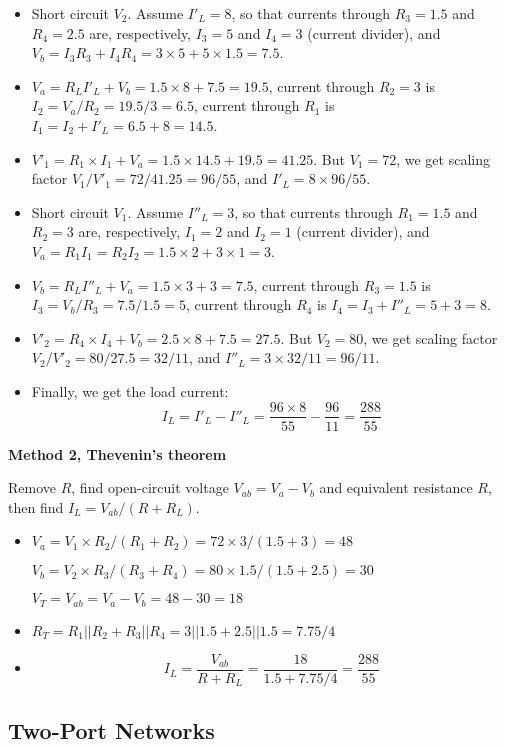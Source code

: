\begin{itemize}

\item Short circuit $V_2$. Assume $I'_L=8$, so that currents through
	$R_3=1.5$ and $R_4=2.5$ are, respectively, $I_3=5$ and $I_4=3$
	(current divider), and $V_b=I_3R_3+I_4R_4=3\times 5+5\times 1.5=7.5$.
\item $V_a=R_L I'_L+V_b=1.5\times 8+7.5=19.5$, current through $R_2=3$
	is $I_2=V_a/R_2=19.5/3=6.5$, current through $R_1$ is 
	$I_1=I_2+I'_L=6.5+8=14.5$.
\item $V'_1=R_1\times I_1+V_a=1.5\times 14.5+19.5=41.25$. But $V_1=72$,
	we get scaling factor $V_1/V'_1=72/41.25=96/55$, and 
	$I'_L=8 \times 96/55$.

\item Short circuit $V_1$. Assume $I''_L=3$, so that currents through
	$R_1=1.5$ and $R_2=3$ are, respectively, $I_1=2$ and $I_2=1$
	(current divider), and $V_a=R_1I_1=R_2I_2=1.5\times 2+3\times 1=3$.
\item $V_b=R_L I''_L+V_a=1.5\times 3+3=7.5$, current through $R_3=1.5$
	is $I_3=V_b/R_3=7.5/1.5=5$, current through $R_4$ is 
	$I_4=I_3+I''_L=5+3=8$.
\item $V'_2=R_4\times I_4+V_b=2.5\times 8+7.5=27.5$. But $V_2=80$,
	we get scaling factor $V_2/V'_2=80/27.5=32/11$, and 
	$I''_L=3\times 32/11=96/11$.

\item Finally, we get the load current:
\[	I_L=I'_L-I''_L=\frac{96\times 8}{55}-\frac{96}{11}=\frac{288}{55} \]

\end{itemize}


{\bf Method 2, Thevenin's theorem}

Remove $R$, find open-circuit voltage $V_{ab}=V_a-V_b$ and equivalent
resistance $R$, then find $I_L=V_{ab}/(R+R_L)$.

\begin{itemize}
\item 
  $V_a=V_1\times R_2/(R_1+R_2)=72\times 3/(1.5+3)=48$

  $V_b=V_2\times R_3/(R_3+R_4)=80\times 1.5/(1.5+2.5)=30$

  $V_T=V_{ab}=V_a-V_b=48-30=18$
\item 
  $R_T=R_1 || R_2 + R_3 || R_4=3||1.5+2.5||1.5=7.75/4$
\item 
  \[ I_L=\frac{V_{ab}}{R+R_L}=\frac{18}{1.5+7.75/4}=\frac{288}{55} \]
\end{itemize}

\subsection*{Two-Port Networks}


